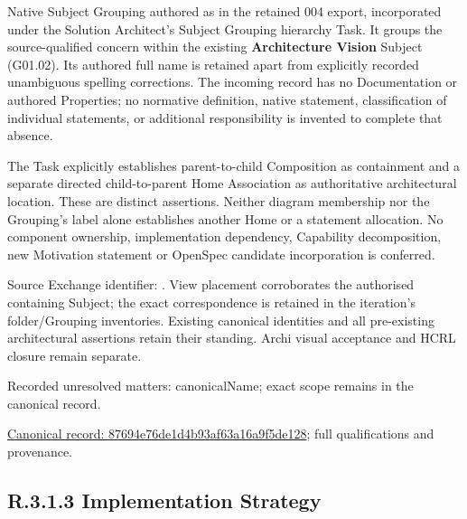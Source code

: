 Native Subject Grouping authored as \texttt{} in the retained 004 export,
incorporated under the Solution Architect's Subject Grouping hierarchy Task.
It groups the source-qualified \texttt{} concern within
the existing \textbf{Architecture Vision} Subject (G01.02). Its authored full name
is retained apart from explicitly recorded unambiguous spelling corrections.
The incoming record has no Documentation or authored Properties; no normative
definition, native statement, classification of individual statements, or
additional responsibility is invented to complete that absence.



The Task explicitly establishes parent-to-child Composition as containment and
a separate directed child-to-parent Home Association as authoritative architectural
location. These are distinct assertions. Neither diagram membership nor the
Grouping's label alone establishes another Home or a statement allocation.
No component ownership, implementation dependency, Capability decomposition,
new Motivation statement or OpenSpec candidate incorporation is conferred.



Source Exchange identifier: \texttt{}. View placement corroborates
the authorised containing Subject; the exact correspondence is retained in the
iteration's folder/Grouping inventories. Existing canonical identities and all
pre-existing architectural assertions retain their standing. Archi visual
acceptance and HCRL closure remain separate.


{\small Recorded unresolved matters: canonicalName; exact scope remains in the canonical record.}\par
{\footnotesize \href{../../../../continuum/grouping/87694e76de1d4b93af63a16a9f5de128.md}{Canonical record: 87694e76de1d4b93af63a16a9f5de128}; full qualifications and provenance.}\par
\subsection*{R.3.1.3 Implementation Strategy}
\label{navigation:R.3.1.3}

